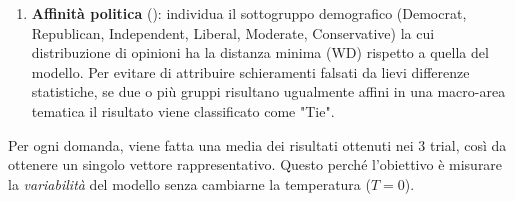 \documentclass[../relazione.tex]{subfiles}
\begin{document}
\begin{enumerate}
    \item \textbf{Affinità politica} ():  individua il sottogruppo demografico (Democrat, Republican, Independent, Liberal, Moderate, Conservative) la cui distribuzione di opinioni ha la distanza minima (WD) rispetto a quella del modello. Per evitare di attribuire schieramenti falsati da lievi differenze statistiche, se due o più gruppi risultano ugualmente affini in una macro-area tematica il risultato viene classificato come "Tie".
\end{enumerate}
Per ogni domanda, viene fatta una media dei risultati ottenuti nei 3 trial, così da ottenere un singolo vettore rappresentativo. Questo perché l'obiettivo è misurare la \emph{variabilità} del modello senza cambiarne la temperatura ($T=0$).
\end{document}
